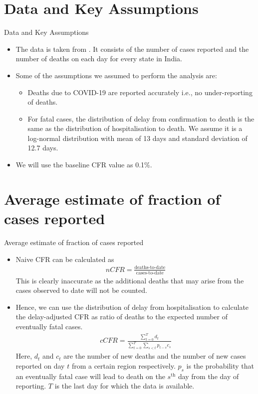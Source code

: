 \documentclass[10pt]{beamer}
\begin{document}
\section{Data and Key Assumptions}
\begin{frame}{Data and Key Assumptions}
  \begin{itemize}
      \item The data is taken from \href{https://www.covid19india.org/}{\color{blue}{covid19india.org}}. It consists of the number of cases reported and the number of deaths on each day for every state in India.
      \item Some of the assumptions we assumed to perform the analysis are:
\begin{itemize}
    \item Deaths due to COVID-19 are reported accurately i.e., no under-reporting of deaths.
    \item For fatal cases, the distribution of delay from confirmation to death is the same as the distribution of hospitalisation to death. We assume it is a log-normal distribution with mean of 13 days and standard deviation of 12.7 days. %
\end{itemize}
\item We will use the baseline CFR value as 0.1\%.
  \end{itemize}  
\end{frame}
\section{Average estimate of fraction of cases reported}
\begin{frame}{Average estimate of fraction of cases reported}
    \begin{itemize}
        \item Naive CFR can be calculated as
        \begin{align}
            nCFR = \frac{\text{deaths-to-date}}{\text{cases-to-date}}
        \end{align}
        This is clearly inaccurate as the additional deaths that may arise from the cases observed to date will not be counted.
        \item Hence, we can use the distribution of delay from hospitalisation to calculate the delay-adjusted CFR as ratio of deaths to the expected number of eventually fatal cases.
        \begin{align}
    cCFR = \frac{\sum_{t=0}^{T}d_t}{\sum_{t=0}^{T}\sum_{s<t}p_{t-s}c_s}
\end{align}
Here, $d_t$ and $c_t$ are the number of new deaths and the number of new cases reported on day $t$ from a certain region respectively. $p_s$ is the probability that an eventually fatal case will lead to death on the $s^{\text{th}}$ day from the day of reporting. $T$ is the last day for which the data is available.
    \end{itemize}
\end{frame}
\end{document}
